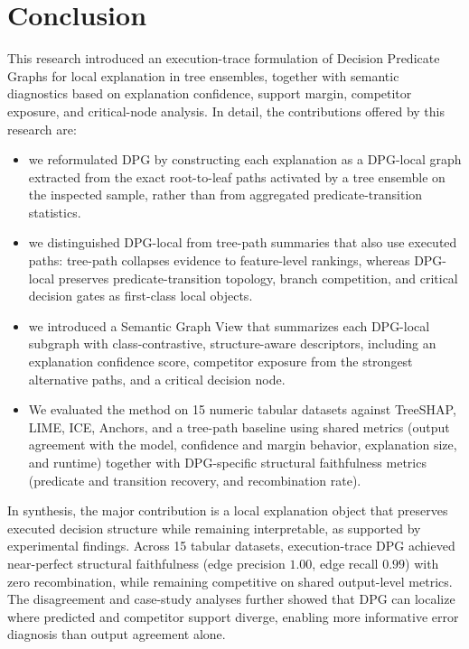 \documentclass[runningheads]{llncs}
\begin{document}
\section{Conclusion}\label{sec:conclusion}
This research introduced an execution-trace formulation of Decision Predicate Graphs for local explanation in tree ensembles, together with semantic diagnostics based on explanation confidence, support margin, competitor exposure, and critical-node analysis. 
In detail, the contributions offered by this research are: 
\begin{itemize}
  \item we reformulated DPG by constructing each explanation as a DPG-local graph extracted from the exact root-to-leaf paths activated by a tree ensemble on the inspected sample, rather than from aggregated predicate-transition statistics.
  \item we distinguished DPG-local from tree-path summaries that also use executed paths: tree-path collapses evidence to feature-level rankings, whereas DPG-local preserves predicate-transition topology, branch competition, and critical decision gates as first-class local objects.
  \item we introduced a Semantic Graph View that summarizes each DPG-local subgraph with class-contrastive, structure-aware descriptors, including an explanation confidence score, competitor exposure from the strongest alternative paths, and a critical decision node.
  \item We evaluated the method on 15 numeric tabular datasets against TreeSHAP, LIME, ICE, Anchors, and a tree-path baseline using shared metrics (output agreement with the model, confidence and margin behavior, explanation size, and runtime) together with DPG-specific structural faithfulness metrics (predicate and transition recovery, and recombination rate).
\end{itemize}
In synthesis, the major contribution is a local explanation object that preserves executed decision structure while remaining interpretable, as supported by experimental findings.
Across 15 tabular datasets, execution-trace DPG achieved near-perfect structural faithfulness (edge precision $1.00$, edge recall $0.99$) with zero recombination, while remaining competitive on shared output-level metrics. The disagreement and case-study analyses further showed that DPG can localize where predicted and competitor support diverge, enabling more informative error diagnosis than output agreement alone.





\end{document}
